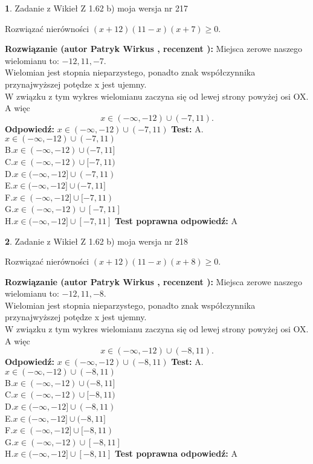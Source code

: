 \documentclass[12pt, a4paper]{article}
\theoremstyle{definition} %
\newtheorem{zad}{}
\newcommand{\zadStart}[1]{\begin{zad}#1\newline}
\newcommand{\zadStop}{\end{zad}}
\newcommand{\rozwStart}[2]{\noindent \textbf{Rozwiązanie (autor #1 , recenzent #2): }\newline}
\newcommand{\rozwStop}{\newline}
\newcommand{\odpStart}{\noindent \textbf{Odpowiedź:}\newline}
\newcommand{\odpStop}{\newline}
\newcommand{\testStart}{\noindent \textbf{Test:}\newline}
\newcommand{\testStop}{\newline}
\newcommand{\kluczStart}{\noindent \textbf{Test poprawna odpowiedź:}\newline}
\newcommand{\kluczStop}{\newline}
\begin{document}
\zadStart{Zadanie z Wikieł Z 1.62 b) moja wersja nr 217}

Rozwiązać nierówności $(x+12)(11-x)(x+7)\ge0$.
\zadStop
\rozwStart{Patryk Wirkus}{}
Miejsca zerowe naszego wielomianu to: $-12, 11, -7$.\\
Wielomian jest stopnia nieparzystego, ponadto znak współczynnika przy\linebreak najwyższej potędze x jest ujemny.\\ W związku z tym wykres wielomianu zaczyna się od lewej strony powyżej osi OX. A więc $$x \in (-\infty,-12) \cup (-7,11).$$
\rozwStop
\odpStart
$x \in (-\infty,-12) \cup (-7,11)$
\odpStop
\testStart
A.$x \in (-\infty,-12) \cup (-7,11)$\\
B.$x \in (-\infty,-12) \cup (-7,11]$\\
C.$x \in (-\infty,-12) \cup [-7,11)$\\
D.$x \in (-\infty,-12] \cup (-7,11)$\\
E.$x \in (-\infty,-12] \cup (-7,11]$\\
F.$x \in (-\infty,-12] \cup [-7,11)$\\
G.$x \in (-\infty,-12) \cup [-7,11]$\\
H.$x \in (-\infty,-12] \cup [-7,11]$
\testStop
\kluczStart
A
\kluczStop



\zadStart{Zadanie z Wikieł Z 1.62 b) moja wersja nr 218}

Rozwiązać nierówności $(x+12)(11-x)(x+8)\ge0$.
\zadStop
\rozwStart{Patryk Wirkus}{}
Miejsca zerowe naszego wielomianu to: $-12, 11, -8$.\\
Wielomian jest stopnia nieparzystego, ponadto znak współczynnika przy\linebreak najwyższej potędze x jest ujemny.\\ W związku z tym wykres wielomianu zaczyna się od lewej strony powyżej osi OX. A więc $$x \in (-\infty,-12) \cup (-8,11).$$
\rozwStop
\odpStart
$x \in (-\infty,-12) \cup (-8,11)$
\odpStop
\testStart
A.$x \in (-\infty,-12) \cup (-8,11)$\\
B.$x \in (-\infty,-12) \cup (-8,11]$\\
C.$x \in (-\infty,-12) \cup [-8,11)$\\
D.$x \in (-\infty,-12] \cup (-8,11)$\\
E.$x \in (-\infty,-12] \cup (-8,11]$\\
F.$x \in (-\infty,-12] \cup [-8,11)$\\
G.$x \in (-\infty,-12) \cup [-8,11]$\\
H.$x \in (-\infty,-12] \cup [-8,11]$
\testStop
\kluczStart
A
\kluczStop
\end{document}
